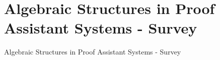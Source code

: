 \chapter{Algebraic Structures in Proof Assistant Systems - Survey}
Algebraic Structures in Proof Assistant Systems - Survey \cite{popescu2014gamygdala}
